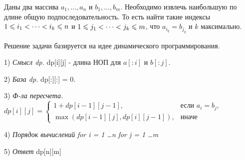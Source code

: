 \Task Даны два массива $a_{1}, \dots, a_{n}$ и $b_{1}, \dots, b_{m}$. Необходимо извлечь
наибольшую по длине общую подпоследовательность. То есть найти такие индексы $1 \leqslant i_{1} < \dots < i_{k} \leqslant n$ и $1 \leqslant j_{1} < \dots < j_{k} \leqslant m$, что $a_{i_{q}} = b_{j_{q}}$ и $k$ максимально.

\Solution Решение задачи базируется на идее динамического программирования.

1) \textit{Смысл dp.} dp[i][j] - длина НОП для $a[: i]$ и $b[: j]$.

2) \textit{База dp.} dp[:][:] = 0.

3) \textit{Ф-ла пересчета.} $dp[i][j] = 
\begin{cases}
1 + dp[i-1][j-1], & \text{если } a_i = b_j, \\
\max(dp[i-1][j], dp[i][j-1]), & \text{иначе}
\end{cases}
$

4) \textit{Порядок вычислений} \textit{for i = 1 \dots n} \textit{for j = 1 \dots m}

5) \textit{Ответ} dp[n][m]


\pagebreak